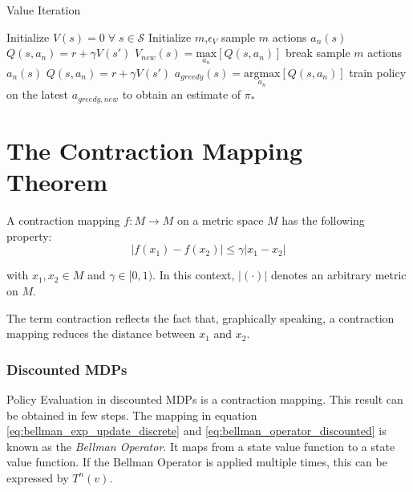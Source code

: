 \begin{algorithm}[hbt]
	\caption{Value Iteration}
	\begin{algorithmic}[0] %
			\State Initialize $V(s) = 0 \; \forall \; s \in \mathcal{S}$
			\State Initialize $m$,\;$\epsilon_V$
					\State sample $m$ actions $a_n(s)$
						\State $Q(s,a_n) = r + \gamma V(s')$
					\EndFor		
					\State $V_{new}(s)=\underset{a_n}{\text{max}}[Q(s,a_n)]$
				\EndFor
					\State break
				\EndIf
			\EndWhile
					\State sample $m$ actions $a_n(s)$
						\State $Q(s,a_n) = r + \gamma V(s')$
					\EndFor
					\State $a_{greedy}(s)=\underset{a_n}{\text{argmax}}[Q(s,a_n)]$
				\EndFor
			\EndFunction
			\State train policy on the latest $a_{greedy,new}$ to obtain an estimate of $\pi_*$
		\EndFunction
	\end{algorithmic}
	\label{algo:vi}
\end{algorithm}

\section{The Contraction Mapping Theorem}
\label{sec:contraction_mappings}
A contraction mapping $f: M \to M$ on a metric space $M$ has the following property:
\begin{equation}
|f(x_1)-f(x_2)| \leq \gamma |x_1-x_2|
\end{equation}

with $x_1,x_2 \in M$ and $\gamma \in [0,1)$. In this context,  $|(\cdot)|$ denotes an arbitrary metric on $M$.

The term contraction reflects the fact that, graphically speaking, a contraction mapping reduces the distance between $x_1$ and $x_2$.

\subsubsection{Discounted MDPs}

Policy Evaluation in discounted MDPs is a contraction mapping. This result can be obtained in few steps. The mapping in equation \ref{eq:bellman_exp_update_discrete} and \ref{eq:bellman_operator_discounted} is known as the \textit{Bellman Operator}. It maps from a state value function to a state value function. If the Bellman Operator is applied multiple times, this can be expressed by $T^n(v)$.

